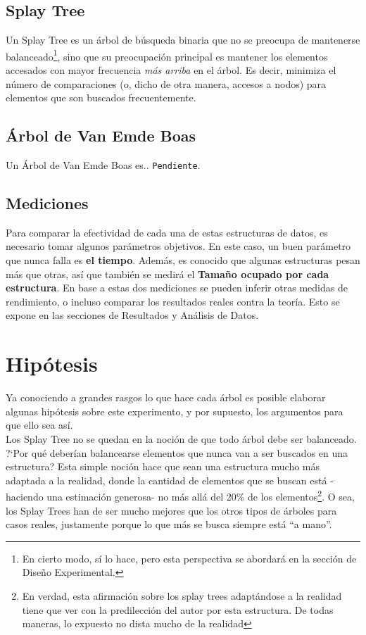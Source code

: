 \documentclass[12pt,letterpaper]{report}
\begin{document}
\subsection{Splay Tree}
\label{subsec:expl_splay}

Un Splay Tree es un árbol de búsqueda binaria que no se preocupa de mantenerse balanceado\footnote{En cierto modo, sí lo hace, pero esta perspectiva se abordará en la sección de Diseño Experimental.}, sino que su preocupación principal es mantener los elementos accesados con mayor frecuencia \emph{más arriba} en el árbol. Es decir, minimiza el número de comparaciones (o, dicho de otra manera, accesos a nodos) para elementos que son buscados frecuentemente.

\subsection{Árbol de Van Emde Boas}
\label{subsec:expl_veb}

Un Árbol de Van Emde Boas es.. \texttt{Pendiente}.

\subsection{Mediciones}
\label{subsec:mediciones}

Para comparar la efectividad de cada una de estas estructuras de datos, es necesario tomar algunos parámetros objetivos. En este caso, un buen parámetro que nunca falla es \textbf{el tiempo}. Además, es conocido que algunas estructuras pesan más que otras, así que también se medirá el \textbf{Tamaño ocupado por cada estructura}. En base a estas dos mediciones se pueden inferir otras medidas de rendimiento, o incluso comparar los resultados reales contra la teoría. Esto se expone en las secciones de Resultados y Análisis de Datos.


\section{Hipótesis}
Ya conociendo a grandes rasgos lo que hace cada árbol es posible elaborar algunas hipótesis sobre este experimento, y por supuesto, los argumentos para que ello sea así.\\

Los Splay Tree no se quedan en la noción de que todo árbol debe ser balanceado. ?`Por qué deberían balancearse elementos que nunca van a ser buscados en una estructura? Esta simple noción hace que sean una estructura mucho más adaptada a la realidad, donde la cantidad de elementos que se buscan está -haciendo una estimación generosa- no más allá del 20\% de los elementos\footnote{En verdad, esta afirmación sobre los splay trees adaptándose a la realidad tiene que ver con la predilección del autor por esta estructura. De todas maneras, lo expuesto no dista mucho de la realidad}. O sea, los Splay Trees han de ser mucho mejores que los otros tipos de árboles para casos reales, justamente porque lo que más se busca siempre está ``a mano''.\\
\end{document}

